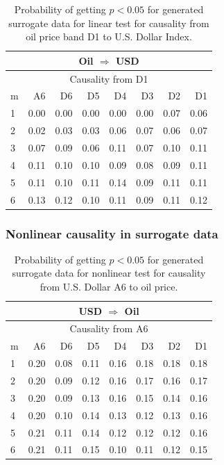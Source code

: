 %
%
\begin{table}[H]
\begin{center}
\begin{tabular}{l|r r r r r r r}
\hline\hline
\multicolumn{8}{c}{Oil $\Rightarrow$ USD}\\
\hline
\multicolumn{8}{c}{Causality from D1}\\
\hline\hline
m & A6 & D6 & D5 & D4 & D3 & D2 & D1 \\
\hline
1 & 0.00 & 0.00 & 0.00 & 0.00 & 0.00 & \cellcolor{mygreen}0.07 & 0.06 \\
2 & 0.02 & 0.03 & 0.03 & 0.06 & 0.07 & 0.06 & 0.07 \\
3 & 0.07 & 0.09 & 0.06 & 0.11 & 0.07 & \cellcolor{mygrey}0.10 & 0.11 \\
4 & 0.11 & 0.10 & 0.10 & 0.09 & 0.08 & 0.09 & \cellcolor{mygrey}0.11 \\
    5 & 0.11 & 0.10 & 0.11 & 0.14 & 0.09 & \cellcolor{mygrey}0.11 & 0.11 \\
6 & 0.13 & 0.12 & 0.10 & 0.11 & 0.09 & 0.11 & 0.12 \\
\hline\hline
\end{tabular}
\caption{Probability of getting $p < 0.05$ for generated surrogate data for linear test for causality from oil price band D1 to U.S. Dollar Index.}
\end{center}
\end{table}

\subsubsection{Nonlinear causality in surrogate data}
%
%
\begin{table}[H]
\begin{center}
\begin{tabular}{l|r r r r r r r}
\hline\hline
\multicolumn{8}{c}{USD $\Rightarrow$ Oil}\\
\hline
\multicolumn{8}{c}{Causality from A6}\\
\hline\hline
m & A6 & D6 & D5 & D4 & D3 & D2 & D1 \\
\hline
1 & 0.20 & 0.08 & \cellcolor{mygrey}0.11 & 0.16 & 0.18 & 0.18 & 0.18 \\
2 & 0.20 & 0.09 & \cellcolor{mygrey}0.12 & 0.16 & 0.17 & 0.16 & 0.17 \\
3 & 0.20 & 0.09 & \cellcolor{mygrey}0.13 & 0.16 & 0.15 & 0.14 & 0.16 \\
4 & 0.20 & 0.10 & \cellcolor{mygrey}0.14 & 0.13 & 0.12 & 0.13 & 0.16 \\
5 & 0.21 & 0.11 & 0.14 & 0.12 & 0.12 & 0.12 & 0.16 \\
6 & 0.21 & 0.11 & 0.15 & 0.10 & 0.11 & 0.12 & 0.15 \\
\hline\hline
\end{tabular}
\caption{Probability of getting $p < 0.05$ for generated surrogate data for nonlinear test for causality from U.S. Dollar A6 to oil price.}
\end{center}
\end{table}

